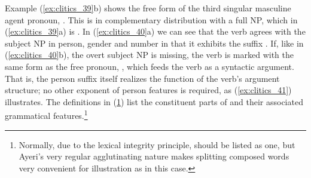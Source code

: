 Example (\ref{ex:clitics_39}b) shows the free form of the third singular
masculine agent pronoun, . This is in complementary
distribution with a full NP, which in (\ref{ex:clitics_39}a) is . In (\ref{ex:clitics_40}a) we can see that the verb agrees
with the subject NP in person, gender and number in that it exhibits the suffix
. If, like in (\ref{ex:clitics_40}b), the overt subject NP is
missing, the verb is marked with the same form as the free pronoun,
, which feeds the verb as a syntactic argument. That is,
the person suffix itself realizes the \Subj{} function of the verb's argument
structure; no other exponent of person features is required, as
(\ref{ex:clitics_41}) illustrates. The definitions in (\ref{ex:clitics_42})
list the constituent parts of  and their
associated grammatical features.\footnote{Normally, due to the lexical
integrity principle,  should be listed as one, but
Ayeri's very regular agglutinating nature makes splitting composed words very
convenient for illustration as in this case.}

\begin{figure}[h]
\begin{morphlex}
\ex\label{ex:clitics_42}
\xe
\end{morphlex}
\end{figure}

